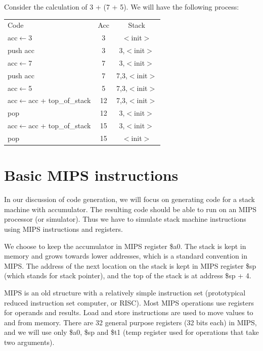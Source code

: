 Consider the calculation of 3 + (7 + 5). We will have the following process:
\begin{table}[ht]
\centering
\begin{tabular}{lcc}
Code & Acc & Stack\\
acc$\leftarrow$3 & 3 & $<$init$>$\\
push acc & 3 & 3,$<$init$>$\\
acc$\leftarrow$7 & 7 & 3,$<$init$>$\\
push acc & 7 & 7,3,$<$init$>$\\
acc$\leftarrow$5 & 5 & 7,3,$<$init$>$\\
acc$\leftarrow$acc + top\_of\_stack & 12 & 7,3,$<$init$>$\\
pop & 12 & 3,$<$init$>$\\
acc$\leftarrow$acc + top\_of\_stack & 15 & 3,$<$init$>$\\
pop & 15 & $<$init$>$
\end{tabular}
\end{table}
\section{Basic MIPS instructions}
In our discussion of code generation, we will focus on generating code for a stack machine with accumulator. The resulting code should be able to run on an MIPS processor (or simulator). Thus we have to simulate stack machine instructions using MIPS instructions and registers.

We choose to keep the accumulator in MIPS register \$a0. The stack is kept in memory and grows towards lower addresses, which is a standard convention in MIPS. The address of the next location on the stack is kept in MIPS register \$sp (which stands for stack pointer), and the top of the stack is at address \$sp + 4.

MIPS is an old structure with a relatively simple instruction set (prototypical reduced instruction set computer, or RISC). Most MIPS operations use registers for operands and results. Load and store instructions are used to move values to and from memory. There are 32 general purpose registers (32 bits each) in MIPS, and we will use only \$a0, \$sp and \$t1 (temp register used for operations that take two arguments). 

